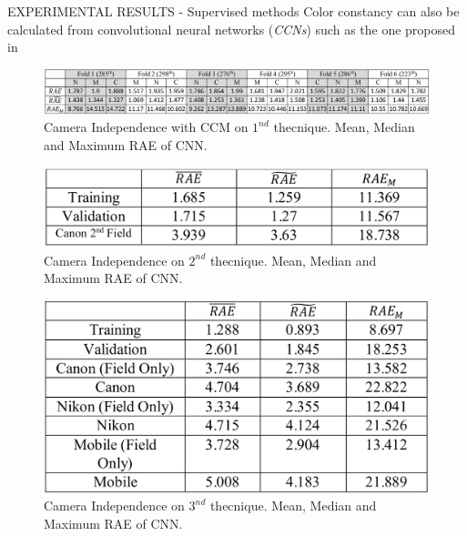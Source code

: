 \documentclass[10pt]{beamer}
\begin{document}
\begin{frame}{EXPERIMENTAL RESULTS - Supervised methods}
    Color constancy can also be calculated from convolutional neural networks (\emph{CCNs}) such as the one proposed in 
    \begin{figure}[htbp]
        \centering
        \includegraphics[width = 1 \linewidth]{images/paper4/25tech1.png}
        \centering
        \caption{Camera Independence with CCM on $ 1^{nd} $ thecnique. Mean, Median and Maximum RAE of CNN.}
        \label{fig:CNNtec1}
    \end{figure}
    \begin{minipage}{\linewidth}
        \centering
        \begin{minipage}{0.45\linewidth}
            \begin{figure}[H]
                \includegraphics[width=\linewidth]{images/paper4/25tech2.png}
                \caption{\small Camera Independence on $ 2^{nd} $ thecnique. Mean, Median and Maximum RAE of CNN.}\label{fig:1}
            \end{figure}
        \end{minipage}
        \hspace{0.05\linewidth}
        \begin{minipage}{0.45\linewidth}
            \begin{figure}[htbp]
                \centering
                \includegraphics[width=0.8\linewidth]{images/paper4/25tech3.png}
                \caption{\small Camera Independence on $ 3^{nd} $ thecnique. Mean, Median and Maximum RAE of CNN.}\label{fig:1}
                \centering
            \end{figure}
        \end{minipage}
    \end{minipage}
\end{frame}
    
\end{document}
